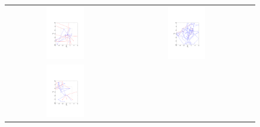 \documentclass{article} %
\begin{document}
\iffalse
\begin{figure}[t!]
\setlength{\tabcolsep}{0em}
\vspace{-1mm}
\begin{center}
\begin{tabular}{ccc}
\includegraphics[trim={3.2cm 6cm 3.2cm 9cm},clip,width=0.33\textwidth]{../plots3/BaselineHMC_l10_eps0_5_log_scatter2D.pdf} 
&\includegraphics[trim={3.2cm 6cm 3.2cm 9cm},clip,width=0.33\textwidth]{../plots3/ReflectiveHMC_l10_eps0_5_log_scatter2D} \\
\includegraphics[trim={3.2cm 6cm 3.2cm 9cm},clip,width=0.33\textwidth]{../plots3/BaselineHMC_l25_eps0_1_log_scatter2D.pdf} 

\end{tabular}
\end{center}
\end{figure}
\end{document}
